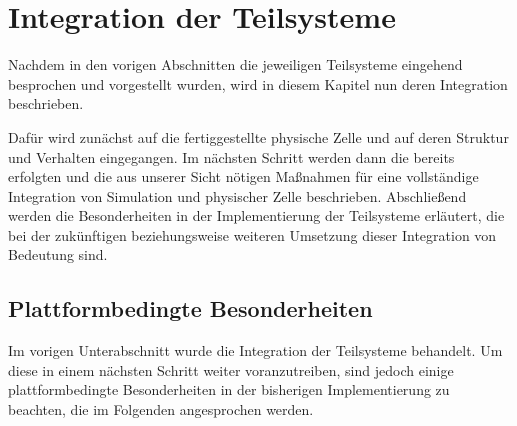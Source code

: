 \section{Integration der Teilsysteme}
Nachdem in den vorigen Abschnitten die jeweiligen Teilsysteme eingehend besprochen und vorgestellt wurden, wird in diesem Kapitel nun deren Integration beschrieben.

Dafür wird zunächst auf die fertiggestellte physische Zelle und auf deren Struktur und Verhalten eingegangen. Im nächsten Schritt werden dann die bereits erfolgten und die aus unserer Sicht nötigen Maßnahmen für eine vollständige Integration von Simulation und physischer Zelle beschrieben. Abschließend werden die Besonderheiten in der Implementierung der Teilsysteme erläutert, die bei der zukünftigen beziehungsweise weiteren Umsetzung dieser Integration von Bedeutung sind.
 



\subsection{Plattformbedingte Besonderheiten}

Im vorigen Unterabschnitt wurde die Integration der Teilsysteme behandelt. Um diese in einem nächsten Schritt weiter voranzutreiben, sind jedoch einige plattformbedingte Besonderheiten in der bisherigen Implementierung zu beachten, die im Folgenden angesprochen werden.


